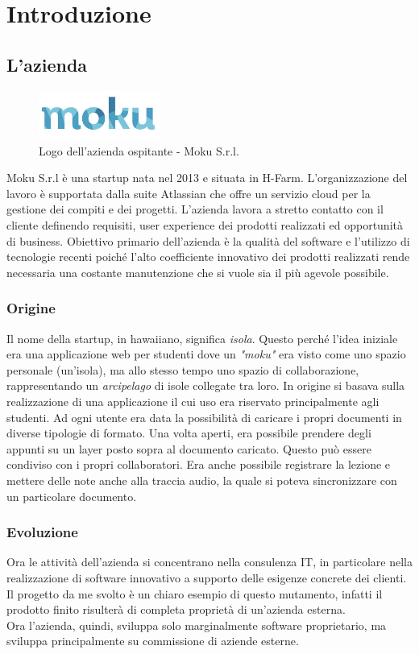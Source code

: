\section{Introduzione} 
\subsection{L'azienda}
\begin{figure}[H]
\begin{center}
\includegraphics[height=1.6cm]{Pics/logo_moku.jpg}
\caption{Logo dell'azienda ospitante - Moku S.r.l.}
\end{center}
\end{figure}
Moku S.r.l è una startup nata nel 2013 e situata in H-Farm. 
L'organizzazione del lavoro è supportata dalla suite Atlassian che offre un servizio cloud per la gestione dei compiti e dei progetti.
L'azienda lavora a stretto contatto con il cliente definendo requisiti, user experience dei prodotti realizzati ed opportunità di business.
Obiettivo primario dell'azienda è la qualità del software e l'utilizzo di tecnologie recenti poiché l'alto coefficiente innovativo dei prodotti realizzati rende necessaria una costante manutenzione che si vuole sia il più agevole possibile.

\subsubsection{Origine}
Il nome della startup, in hawaiiano, significa \textit{isola}. Questo perché l'idea iniziale era una applicazione web per studenti dove un \textit{"moku"} era visto come uno spazio personale (un’isola), ma allo stesso tempo uno spazio di collaborazione, rappresentando un \textit{arcipelago} di isole collegate tra loro.
In origine si basava sulla realizzazione di una applicazione il cui uso era riservato principalmente agli studenti. Ad ogni utente era data la possibilità di caricare i propri documenti in diverse tipologie di formato. Una volta aperti, era possibile prendere degli appunti su un layer posto sopra al documento caricato. Questo può essere condiviso con i propri collaboratori. Era anche possibile registrare la lezione e mettere delle note anche alla traccia audio, la quale si poteva sincronizzare con un particolare documento.
\subsubsection{Evoluzione}
Ora le attività dell'azienda si concentrano nella consulenza IT, in particolare nella realizzazione di software innovativo a supporto delle esigenze concrete dei clienti. Il progetto da me svolto è un chiaro esempio di questo mutamento, infatti il prodotto finito risulterà di completa proprietà di un'azienda esterna.  \\ Ora l'azienda, quindi, sviluppa solo marginalmente software proprietario, ma sviluppa principalmente su commissione di aziende esterne.

